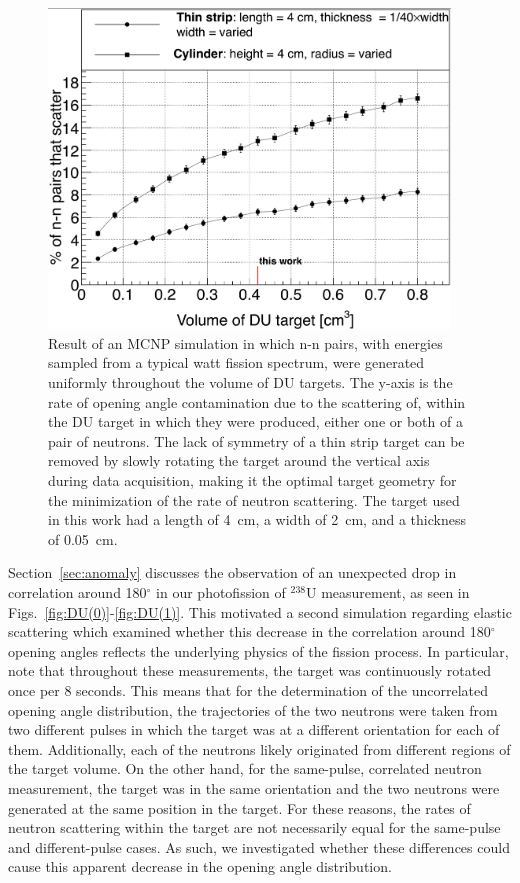 \begin{figure}
    \centering
    \includegraphics[width = 0.95\textwidth]{Content/Errors/ElasticScatteringPlot.png}
    \caption{
     Result of an MCNP simulation in which n-n pairs, with energies sampled from a typical watt fission spectrum, were generated uniformly throughout the volume of DU targets.
        The y-axis is the rate of opening angle contamination due to the scattering of, within the DU target in which they were produced, either one or both of a pair of neutrons.
    The lack of symmetry of a thin strip target can be removed by slowly rotating the target around the vertical axis during data acquisition, making it the optimal target geometry for the minimization of the rate of neutron scattering.
    The target used in this work had a length of 4~cm, a width of 2~cm, and a thickness of 0.05~cm.
    }
    \label{fig:ElasticScatteringPlot}
\end{figure}

Section~\ref{sec:anomaly} discusses the observation of an unexpected drop in correlation around 180$^{\circ}$ in our photofission of $^{238}$U measurement, as seen in Figs.~\ref{fig:DU(0)}-\ref{fig:DU(1)}.
This motivated a second simulation regarding elastic scattering which examined whether this decrease in the correlation around 180$^{\circ}$ opening angles reflects the underlying physics of the fission process.
In particular, note that throughout these measurements, the target was continuously rotated once per 8 seconds.
This means that for the determination of the uncorrelated opening angle distribution, the trajectories of the two neutrons were taken from two different pulses in which the target was at a different orientation for each of them.
Additionally, each of the neutrons likely originated from different regions of the target volume.
On the other hand, for the same-pulse, correlated neutron measurement, the target was in the same orientation and the two neutrons were generated at the same position in the target.
For these reasons, the rates of neutron scattering within the target are not necessarily equal for the same-pulse and different-pulse cases.
As such, we investigated whether these differences could cause this apparent decrease in the opening angle distribution.

